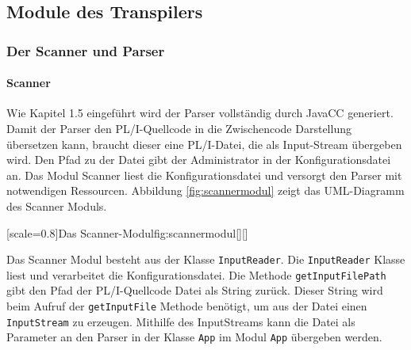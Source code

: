 
 \pagebreak
\subsection{Module des Transpilers}

\subsubsection{Der Scanner und Parser}
\paragraph{Scanner}
Wie Kapitel 1.5 eingeführt wird der Parser vollständig durch 
JavaCC generiert.
Damit der Parser den PL/I-Quellcode in die Zwischencode Darstellung übersetzen kann,
braucht dieser eine PL/I-Datei, die als Input-Stream übergeben wird.
Den Pfad zu der Datei gibt der Administrator in der Konfigurationsdatei an.
Das Modul Scanner liest die Konfigurationsdatei und versorgt den Parser mit notwendigen Ressourcen.
Abbildung \ref{fig:scannermodul} zeigt das UML-Diagramm des Scanner Moduls.

[scale=0.8]{Das Scanner-Modul}{fig:scannermodul}[][]

Das Scanner Modul besteht aus der Klasse \verb+InputReader+. 
Die \verb+InputReader+ Klasse liest und verarbeitet die Konfigurationsdatei. Die Methode \verb+getInputFilePath+ gibt den Pfad der PL/I-Quellcode Datei als String zurück.
Dieser String wird beim Aufruf der \verb+getInputFile+ Methode benötigt, um aus der Datei einen \verb+InputStream+ zu erzeugen.
Mithilfe des InputStreams kann die Datei als Parameter an den Parser in der Klasse \verb+App+ im Modul \verb+App+
übergeben werden. 

